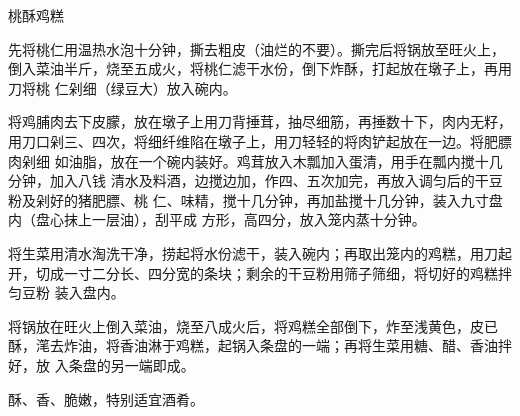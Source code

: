 \begin{recipe}{桃酥鸡糕}

\ingredients


\preparation

\step 先将桃仁用温热水泡十分钟，撕去粗皮（油烂的不要）。撕完后将锅放至旺火上，
倒入菜油半斤，烧至五成火，将桃仁滤干水份，倒下炸酥，打起放在墩子上，再用刀将桃
仁剁细（绿豆大）放入碗内。

\step 将鸡脯肉去下皮朦，放在墩子上用刀背捶茸，抽尽细筋，再捶数十下，肉内无籽，
用刀口剁三、四次，将细纤维陷在墩子上，用刀轻轻的将肉铲起放在一边。将肥膘肉剁细
如油脂，放在一个碗内装好。鸡茸放入木瓢加入蛋清，用手在瓢内搅十几分钟，加入八钱
清水及料酒，边搅边加，作四、五次加完，再放入调匀后的干豆粉及剁好的猪肥膘、桃
仁、味精，搅十几分钟，再加盐搅十几分钟，装入九寸盘内（盘心抹上一层油），刮平成
方形，高四分，放入笼内蒸十分钟。

\step 将生菜用清水淘洗干净，捞起将水份滤干，装入碗内；再取出笼内的鸡糕，用刀起
开，切成一寸二分长、四分宽的条块；剩余的干豆粉用筛子筛细，将切好的鸡糕拌匀豆粉
装入盘内。

\step 将锅放在旺火上倒入菜油，烧至八成火后，将鸡糕全部倒下，炸至浅黄色，皮已
酥，滗去炸油，将香油淋于鸡糕，起锅入条盘的一端；再将生菜用糖、醋、香油拌好，放
入条盘的另一端即成。

\features

酥、香、脆嫩，特别适宜酒肴。

\end{recipe}

